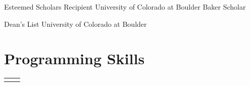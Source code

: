 \documentclass[11pt]{article} %
\begin{document}


        
    
    
    
    {}
    {Esteemed Scholars Recipient}
    {University of Colorado at Boulder}
    {Baker Scholar}
        
    {}
    {Dean's List}
    {University of Colorado at Boulder}
    {}


\pagebreak[3]
\section{Programming Skills}




\begin{supertabular}{rl} %

    \tableentry{}{\LaTeX}{}



\end{supertabular}
\end{document}
